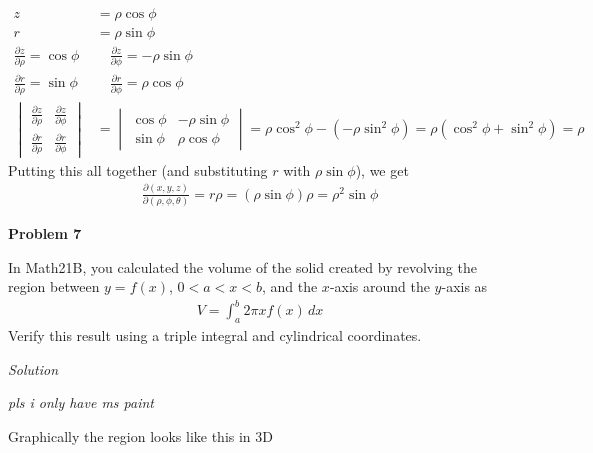 \documentclass{article}
\newcommand{\lrp}[1]{\left( #1 \right)}
\newcommand{\Solution}{\textit{Solution}}
\begin{document}
\begin{align*}
    z&=\rho\cos\phi\\
    r&=\rho\sin\phi\\
    \frac{\partial z}{\partial \rho} = \cos\phi &\hspace{1em}\frac{\partial z}{\partial \phi}=-\rho\sin\phi\\
    \frac{\partial r}{\partial \rho} = \sin\phi &\hspace{1em}\frac{\partial r}{\partial \phi}=\rho\cos\phi\\
    \begin{vmatrix}
      \frac{\partial z}{\partial \rho} & \frac{\partial z}{\partial \phi}\\
      \frac{\partial r}{\partial \rho} &
      \frac{\partial r}{\partial \phi}
    \end{vmatrix}&=\begin{vmatrix}
      \cos\phi & -\rho\sin\phi\\
        \sin\phi & \rho\cos\phi
    \end{vmatrix}=\rho\cos^2\phi -\lrp{-\rho\sin^2\phi}=\rho\lrp{\cos^2\phi+\sin^2\phi}=\rho
\end{align*}
Putting this all together (and substituting $r$ with $\rho\sin\phi$), we get
\begin{align*}
    \frac{\partial (x,y,z)}{\partial (\rho,\phi,\theta)}=r\rho=\lrp{\rho\sin\phi}\rho=\boxed{\rho^2\sin\phi}
\end{align*}
\textbf{Problem 7}

In Math21B, you calculated the volume of the solid created by revolving the region between $y=f(x)$, $0<a<x<b$, and the $x$-axis around the $y$-axis as
\begin{align*}
    V=\int_a^b 2\pi xf(x)\,dx
\end{align*}
Verify this result using a triple integral and cylindrical coordinates.

\Solution

\textit{pls i only have ms paint}

Graphically the region looks like this in 3D


\end{document}
